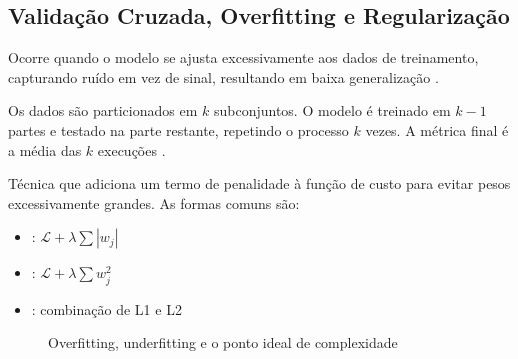 \subsection{Validação Cruzada, Overfitting e Regularização}
\begin{definicao}[Overfitting]
Ocorre quando o modelo se ajusta excessivamente aos dados de treinamento,
capturando ruído em vez de sinal, resultando em baixa generalização
\cite{hastie2009elements}.
\end{definicao}
\begin{definicao}
Os dados são particionados em $k$ subconjuntos. O modelo é treinado em $k-1$
partes e testado na parte restante, repetindo o processo $k$ vezes. A
métrica final é a média das $k$ execuções \cite{bishop2006pattern}.
\end{definicao}
\begin{definicao}[Regularização]
Técnica que adiciona um termo de penalidade à função de custo para evitar
pesos excessivamente grandes. As formas comuns são:
\begin{itemize}
\item {}: $\mathcal{L} + \lambda \sum |w_j|$
\item {}: $\mathcal{L} + \lambda \sum w_j^2$
\item {}: combinação de L1 e L2
\end{itemize}
\end{definicao}
\begin{figure}[htb]
\centering
\caption{Overfitting, underfitting e o ponto ideal de complexidade}
\label{fig:overfitting}
\end{figure}

